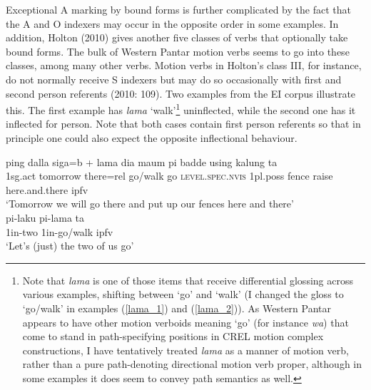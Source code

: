 Exceptional A marking by bound forms is further complicated by the fact that the A and O indexers may occur in the opposite order in some examples. In addition, Holton (2010) gives another five classes of verbs that optionally take bound forms. The bulk of Western Pantar motion verbs seems to go into these classes, among many other verbs. Motion verbs in Holton's class III, for instance, do not normally receive S indexers but may do so occasionally with first and second person referents (2010: 109). Two examples from the EI corpus illustrate this. The first example has \textit{lama} `walk'\footnote{Note that \textit{lama} is one of those items that receive differential glossing across various examples, shifting between `go' and `walk' (I changed the gloss to `go/walk' in examples (\ref{lama_1}) and (\ref{lama_2})). As Western Pantar appears to have other motion verboids meaning `go' (for instance \textit{wa}) that come to stand in path-specifying positions in CREL motion complex constructions, I have tentatively treated \textit{lama} as a manner of motion verb, rather than a pure path-denoting directional motion verb proper, although in some examples it does seem to convey path semantics as well.} uninflected, while the second one has it inflected for person. Note that both cases contain first person referents so that in principle one could also expect the opposite inflectional behaviour.

\ea \label{lama_1}
\gll ping dalla siga=b + lama dia maum pi badde using kalung ta \\
1\acs{sg}.\acs{act} tomorrow there=\acs{rel} go/walk go \textsc{level.spec.nvis} 1\acs{pl}.\acs{poss} fence raise here.and.there \acs{ipfv} \\
\glft `Tomorrow we will go there and put up our fences here and there' \\ 
\z
\xe
\ea \label{lama_2}
\gll pi-laku pi-lama ta \\
1\acs{in}-two 1\acs{in}-go/walk \acs{ipfv} \\
\glft `Let's (just) the two of us go' \\ 
\z
\xe

